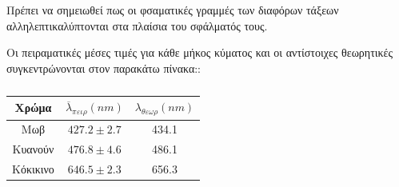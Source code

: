 \documentclass[a4paper]{article}
\begin{document}


Πρέπει να σημειωθεί πως οι φσαματικές γραμμές των διαφόρων τάξεων αλληλεπτικαλύπτονται στα πλαίσια του σφάλματός τους.

\newpage 

Οι πειραματικές μέσες τιμές για κάθε μήκος κύματος και οι αντίστοιχες θεωρητικές συγκεντρώνονται στον παρακάτω πίνακα:\footnotemark:
\footnotetext{Οι μέσες τιμές και τα αντίστοιχα σφάλματα προκύπτουν από τις σχέσεις: 
a)$\overline{\lambda} = \frac{1}{6}\sum_{i=1}^{6}\lambda_i$ και
 b) $\delta\lambda = \left( \frac{\sum_{i=1}^{6}(\lambda_i-\overline{\lambda})^2}{6\cdot 5}\right)^{1/2} $}
 
 \begin{table}[h!]
\centering
\caption{ }
	\begin{tabular}{c|c|c}
	Χρώμα & $\overline{\lambda}_{πειρ}(nm)$ & $\lambda_{θεωρ}(nm)$  \\
	\hline \hline 
	Μωβ      & \underline{$427.2 \pm 2.7$} & 434.1 \\ 
	Κυανούν  & \underline{$476.8 \pm 4.6$} & 486.1 \\ 
	Κόκικινο & \underline{$646.5 \pm 2.3$} & 656.3 \\  
	\end{tabular}	 
 
 \end{table}
 
\end{document}
